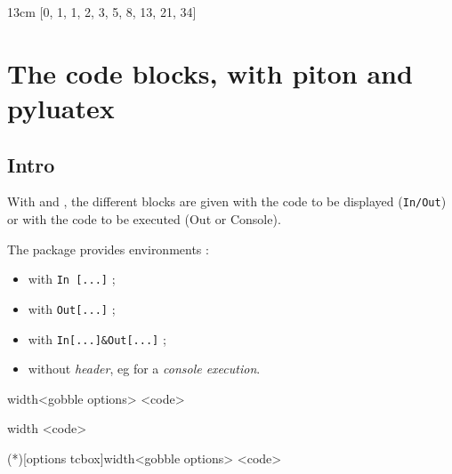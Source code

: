 \documentclass[english,11pt,a4paper]{article}
\begin{document}
\begin{NotebookConsole}{13cm}
[0, 1, 1, 2, 3, 5, 8, 13, 21, 34]
\end{NotebookConsole}

\pagebreak

\section{The code blocks, with piton and pyluatex}

\subsection{Intro}

With  and , the different blocks are given with the code to be displayed (\texttt{In/Out}) or with the code to be executed (\textsf{Out} or \textsf{Console}).

The package provides environments :

\begin{itemize}
	\item with \texttt{In~[...]} ;
	\item with \texttt{Out[...]} ;
	\item with \texttt{In[...]\&{}Out[...]} ;
	\item without \textit{header}, eg for a \textit{console execution}.
\end{itemize}

\begin{codehigh}[language=latex/latex2,style/main=cyan!10,style/code=cyan!10]
\begin{NotebookPitonRaw}{width}<gobble options>
<code>
\end{NotebookPitonRaw}
\end{codehigh}

\begin{codehigh}[language=latex/latex2,style/main=cyan!10,style/code=cyan!10]
\begin{NotebookPitonMarkdown}{width}
<code>
\end{NotebookPitonMarkdown}
\end{codehigh}

\begin{codehigh}[language=latex/latex2,style/main=cyan!10,style/code=cyan!10]
\begin{NotebookPitonIn}(*)[options tcbox]{width}<gobble options>
<code>
\end{NotebookPitonIn}
\end{codehigh}
\end{document}
